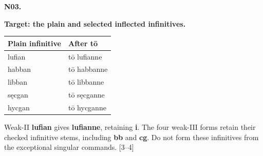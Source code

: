 \par\begin{minipage}{\linewidth}\raggedright
\textbf{N03.}

\textbf{Target: the plain and selected inflected infinitives.}

\par\begingroup
\fontsize{10.5}{13.2}\selectfont
\setlength{\LTleft}{0pt}\setlength{\LTright}{\fill}
\noindent
\begin{tabular}{@{}>{\raggedright\arraybackslash}p{67.8mm}>{\raggedright\arraybackslash}p{53.39mm}@{}}
\toprule
\textbf{Plain infinitive} & \textbf{After tō} \\
\midrule
lufian & tō lufianne \\
habban & tō habbanne \\
libban & tō libbanne \\
sęcgan & tō sęcganne \\
hycgan & tō hycganne \\
\bottomrule
\end{tabular}
\par\endgroup

Weak-II \textbf{lufian} gives \textbf{lufianne}, retaining \textbf{i}. The four weak-III forms retain their checked infinitive stems, including \textbf{bb} and \textbf{cg}. Do not form these infinitives from the exceptional singular commands. [3–4]

\end{minipage}\par\addvspace{4pt}

